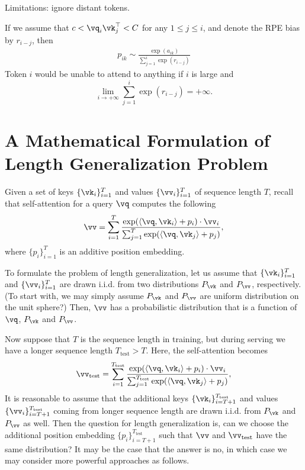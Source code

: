 Limitations: ignore distant tokens.

If we assume that $c<\vq_i\vk_j^{\top}<C$ for any $1\leq j\leq i$, and denote the RPE bias by $r_{i-j}$, then
\begin{align*}
    p_{ik} \sim \frac{\exp(a_{ik})}{\sum_{j=1}^i \exp(r_{i-j})}
\end{align*}
Token $i$ would be unable to attend to anything if $i$ is large and 
$$
    \lim_{i\to +\infty} \sum_{j=1}^i \exp(r_{i-j})=+\infty.
$$

\section{A Mathematical Formulation of Length Generalization Problem}

Given a set of keys $\{\vk_i\}_{i=1}^T$ and values $\{\vv_i\}_{i=1}^T$ of sequence length $T$, recall that self-attention for a query $\vq$  computes the following
\begin{equation}
    \vv = \sum_{i = 1}^T\frac{\exp(\langle \vq, \vk_i \rangle + p_i) \cdot \vv_i}{ \sum_{j=1}^T \exp(\langle \vq, \vk_j \rangle + p_j)},
\end{equation}
where $\{p_i\}_{i=1}^T$ is an additive position embedding.

To formulate the problem of length generalization, let us assume that $\{\vk_i\}_{i=1}^T$ and $\{\vv_i\}_{i=1}^T$ are drawn i.i.d. from two distributions $P_{\vk}$ and $P_{\vv}$, respectively. (To start with, we may simply assume $P_{\vk}$ and $P_{\vv}$ are uniform distribution on the unit sphere?)
Then, $\vv$ has a probabilistic distribution that is a function of $\vq$, $P_{\vk}$ and $P_{\vv}$. 

Now suppose that $T$ is the sequence length in training, but during serving we have a longer sequence length $T_\text{test} > T$. Here, the self-attention becomes
\begin{equation}
    \vv_\text{test} = \sum_{i = 1}^{T_\text{test}}\frac{\exp(\langle \vq, \vk_i \rangle + p_i) \cdot \vv_i}{ \sum_{j=1}^{T_\text{test}} \exp(\langle \vq, \vk_j \rangle + p_j)},
\end{equation}
It is reasonable to assume that the additional keys $\{\vk_i\}_{i=T+1}^{T_\text{test}}$ and values  $\{\vv_i\}_{i=T+1}^{T_\text{test}}$ coming from longer sequence length are drawn i.i.d. from $P_{\vk}$ and $P_{\vv}$ as well.
Then the question for length generalization is, can we choose the additional position embedding $\{p_i\}_{i=T+1}^{T_\text{test}}$ such that $\vv$ and $\vv_\text{test}$ have the same distribution?
It may be the case that the answer is no, in which case we may consider more powerful approaches as follows.

